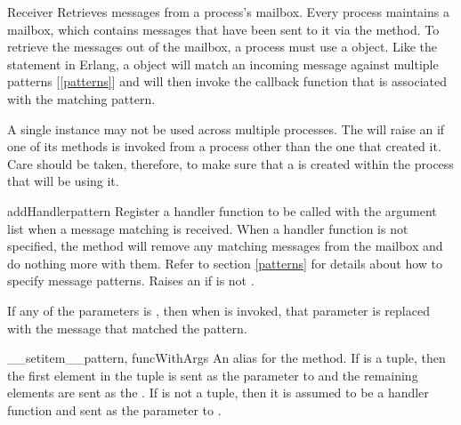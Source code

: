 \documentclass{howto}
\begin{document}
\begin{classdesc}{Receiver}{}
Retrieves messages from a process's mailbox. Every process maintains a mailbox,
which contains messages that have been sent to it via the 
method. To retrieve the messages out of the mailbox, a process must use a
 object. Like the  statement in Erlang, a
 object will match an incoming message against multiple patterns
[\ref{patterns}] and will then invoke the callback function that is associated
with the matching pattern.

A single  instance may not be used across multiple processes.
The  will raise an  if one of its
methods is invoked from a process other than the one that created it. Care
should be taken, therefore, to make sure that a  is created
within the process that will be using it.

\begin{methoddesc}{addHandler}{pattern}
Register a handler function  to be called with the  argument
list when a message matching  is received. When a handler function
 is not specified, the  method will remove any
matching messages from the mailbox and do nothing more with them. Refer to
section \ref{patterns} for details about how to specify message patterns. Raises
an  if  is not .

If any of the  parameters is , then when
 is invoked, that parameter is replaced with the message that matched
the pattern.

\end{methoddesc}

\begin{methoddesc}{__setitem__}{pattern, funcWithArgs}
\opindex{[]}
An alias for the  method. If  is a tuple,
then the first element in the tuple is sent as the  parameter to
 and the remaining elements are sent as the . If
 is not a tuple, then it is assumed to be a handler function
and sent as the  parameter to .


\end{methoddesc}
\end{classdesc}
\end{document}
